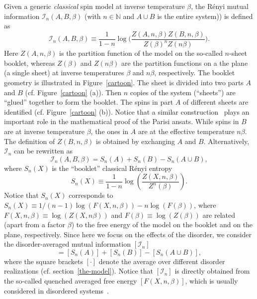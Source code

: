 \documentclass[twocolumn,superscriptaddress,prb,10pt]{revtex4-1}
\begin{document}
Given a generic \emph{classical} spin model at inverse temperature $\beta$, 
the R\'enyi mutual information ${\mathcal I}_n(A,B,\beta)$ (with $n\in\mathbb{N}$
and $A \cup B$ is the entire system)) 
is defined as~\cite{jaconis-2013,stephan-2014} 
%
\begin{equation}
\label{MI}
{\mathcal I}_n(A,B,\beta)\equiv\frac{1}{1-n}\log\Big(
\frac{Z(A,n,\beta)Z(B,n,\beta)}{Z(\beta)^nZ(n\beta)}
\Big).
\end{equation}
%
Here $Z(A,n,\beta)$ is the partition function of the model on the so-called 
$n$-sheet booklet, whereas $Z(\beta)$ and $Z(n\beta)$ are the partition functions 
on a the plane (a single sheet) at inverse temperatures $\beta$ and $n\beta$, 
respectively. The booklet geometry is illustrated in Figure~\ref{cartoon}. The 
sheet is divided into two parts $A$ and $B$ (cf. Figure~\ref{cartoon} (a)). 
Then $n$ copies of the system (``sheets'') are ``glued'' together to form the 
booklet. The spins in part $A$ of different sheets are identified (cf. 
Figure~\ref{cartoon} (b)). Notice that a similar construction~\cite{guerra-2002} 
plays an important role in the mathematical proof of the Parisi ansats. While spins 
in $B$ are at inverse temperature $\beta$, the ones in $A$ are at the effective 
temperature $n\beta$. The definition of $Z(B,n,\beta)$ is obtained by exchanging 
$A$ and $B$. Alternatively, ${\mathcal I}_n$ can be rewritten as 
%
\begin{equation}
{\mathcal I}_n(A,B,\beta)=S_n(A)+S_n(B)-S_n(A\cup B),
\end{equation}
%
where $S_n(X)$ is the ``booklet'' classical R\'enyi entropy
%
\begin{equation}
\label{renyi}
S_n(X)\equiv \frac{1}{1-n}\log\left(\frac{Z(X,n,\beta)}{Z^n(\beta)}\right).
\end{equation}
%
Notice that $S_n(X)$ corresponds to $S_n(X)\equiv1/(n-1)\log(F(X,n,\beta))
-n\log(F(\beta))$, where $F(X,n,\beta)\equiv\log(Z(X,n\beta))$ and $F(\beta)
\equiv\log(Z(\beta))$ are related (apart from a factor $\beta$) to the 
free energy of the model on the booklet and on the plane, respectively.
Since here we focus on the effects of the disorder, we consider 
the disorder-averaged mutual information $[{\mathcal I}_n]$ 
%
\begin{equation}
[{\mathcal I}_n(A,B,\beta)]=[S_n(A)]+[S_n(B)]-[S_n(A\cup B)],
\end{equation}
%
where the square brackets $[\cdot]$ denote the average over different disorder 
realizations (cf. section~\ref{the-model}). Notice that $[{\mathcal I}_n]$ is 
directly obtained from the so-called quenched averaged free energy $[F(X,n,\beta)]$, 
which is usually considered in disordered systems~\cite{cardy-book}. 
\end{document}
